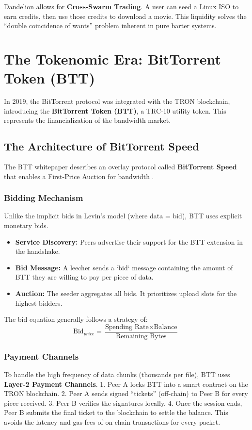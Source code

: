 \documentclass[12pt]{article}
\begin{document}
Dandelion allows for \textbf{Cross-Swarm Trading}. A user can seed a Linux ISO to earn credits, then use those credits to download a movie. This liquidity solves the ``double coincidence of wants'' problem inherent in pure barter systems.

\section{The Tokenomic Era: BitTorrent Token (BTT)}

In 2019, the BitTorrent protocol was integrated with the TRON blockchain, introducing the \textbf{BitTorrent Token (BTT)}, a TRC-10 utility token. This represents the financialization of the bandwidth market.

\subsection{The Architecture of BitTorrent Speed}
The BTT whitepaper describes an overlay protocol called \textbf{BitTorrent Speed} that enables a First-Price Auction for bandwidth \cite{BTTWhitepaper}.

\subsubsection{Bidding Mechanism}
Unlike the implicit bids in Levin's model (where data = bid), BTT uses explicit monetary bids.
\begin{itemize}
    \item \textbf{Service Discovery:} Peers advertise their support for the BTT extension in the handshake.
    \item \textbf{Bid Message:} A leecher sends a `bid` message containing the amount of BTT they are willing to pay per piece of data.
    \item \textbf{Auction:} The seeder aggregates all bids. It prioritizes upload slots for the highest bidders.
\end{itemize}

The bid equation generally follows a strategy of:
\begin{equation}
\text{Bid}_{price} = \frac{\text{Spending Rate} \times \text{Balance}}{\text{Remaining Bytes}}
\end{equation}

\subsubsection{Payment Channels}
To handle the high frequency of data chunks (thousands per file), BTT uses \textbf{Layer-2 Payment Channels}.
1. Peer A locks BTT into a smart contract on the TRON blockchain.
2. Peer A sends signed ``tickets'' (off-chain) to Peer B for every piece received.
3. Peer B verifies the signatures locally.
4. Once the session ends, Peer B submits the final ticket to the blockchain to settle the balance.
This avoids the latency and gas fees of on-chain transactions for every packet.
\end{document}

